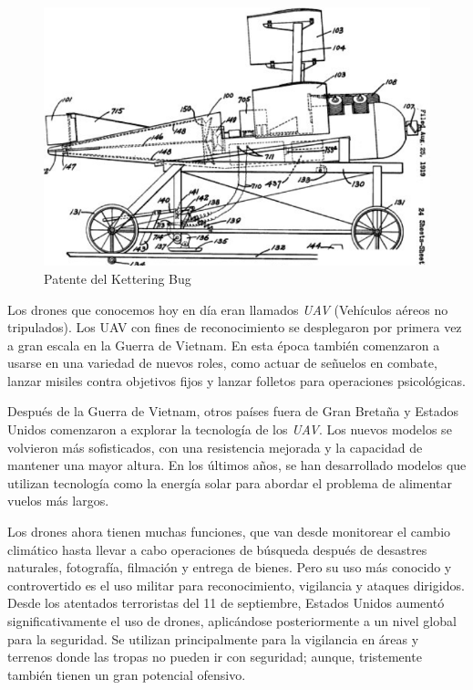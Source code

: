 \begin{figure}[H]
	\center
	\includegraphics[scale=0.5]{imagenes/EstadodelArte/ketbug.png}
	\caption{Patente del Kettering Bug}
	\label{fig:Kettering Bug}
\end{figure}
 
Los drones que conocemos hoy en día eran llamados \textit{UAV} (Vehículos aéreos no tripulados). Los UAV con fines de reconocimiento se desplegaron por primera vez a gran escala en la Guerra de Vietnam. En esta época también comenzaron a usarse en una variedad de nuevos roles, como actuar de señuelos en combate, lanzar misiles contra objetivos fijos y lanzar folletos para operaciones psicológicas. 

Después de la Guerra de Vietnam, otros países fuera de Gran Bretaña y Estados Unidos comenzaron a explorar la tecnología de los \textit{UAV}. Los nuevos modelos se volvieron más sofisticados, con una resistencia mejorada y la capacidad de mantener una mayor altura. En los últimos años, se han desarrollado modelos que utilizan tecnología como la energía solar para abordar el problema de alimentar vuelos más largos. \newline

Los drones ahora tienen muchas funciones, que van desde monitorear el cambio climático hasta llevar a cabo operaciones de búsqueda después de desastres naturales, fotografía, filmación y entrega de bienes. Pero su uso más conocido y controvertido es el uso militar para reconocimiento, vigilancia y ataques dirigidos. Desde los atentados terroristas del 11 de septiembre, Estados Unidos aumentó significativamente el uso de drones, aplicándose posteriormente a un nivel global para la seguridad. Se utilizan principalmente para la vigilancia en áreas y terrenos donde las tropas no pueden ir con seguridad; aunque, tristemente también tienen un gran potencial ofensivo. \newline \cite{HistDrones} \cite{HistDrones2}



